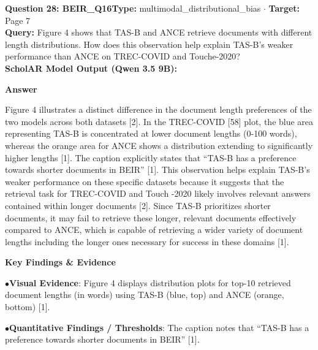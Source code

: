\documentclass[10pt,a4paper]{article}
\begin{document}
\vspace{4pt}
\begin{tcolorbox}[questionbox]
{\noindent\bfseries\large\color{navy} Question 28: BEIR\_Q16}\hfill {\footnotesize\color{darkteal}\textbf{Type:} multimodal\_distributional\_bias $\cdot$ \textbf{Target:} Page 7}\\[4pt]
{\noindent\bfseries\color{accentblue} Query: } Figure 4 shows that TAS-B and ANCE retrieve documents with different length distributions. How does this observation help explain TAS-B's weaker performance than ANCE on TREC-COVID and Touche-2020?\\[6pt]
{\noindent\bfseries\color{navy} ScholAR Model Output (Qwen 3.5 9B):}\\[2pt]
{\small \noindent \textbf{Answer}\par\vspace{3pt}Figure 4 illustrates a distinct difference in the document length preferences of the two models across both datasets [2]. In the TREC-COVID [58] plot, the blue area representing TAS-B is concentrated at lower document lengths (0-100 words), whereas the orange area for ANCE shows a distribution extending to significantly higher lengths [1].  The caption explicitly states that ``TAS-B has a preference towards shorter documents in BEIR'' [1]. This observation helps explain TAS-B's weaker performance on these specific datasets because it suggests that the retrieval task for TREC-COVID and Touch -2020 likely involves relevant answers contained within longer documents [2]. Since TAS-B prioritizes shorter documents, it may fail to retrieve these longer, relevant documents effectively compared to ANCE, which is capable of retrieving a wider variety of document lengths including the longer ones necessary for success in these domains [1].\par\vspace{3pt}\noindent \textbf{Key Findings \& Evidence}\par\vspace{3pt}\noindent\hspace*{8pt}$\bullet$\hspace*{4pt}\textbf{Visual Evidence}: Figure 4 displays distribution plots for top-10 retrieved document lengths (in words) using TAS-B (blue, top) and ANCE (orange, bottom) [1].\par\vspace{3pt}\noindent\hspace*{8pt}$\bullet$\hspace*{4pt}\textbf{Quantitative Findings / Thresholds}: The caption notes that ``TAS-B has a preference towards shorter documents in BEIR'' [1].}\\[6pt]

\end{tcolorbox}
\end{document}
